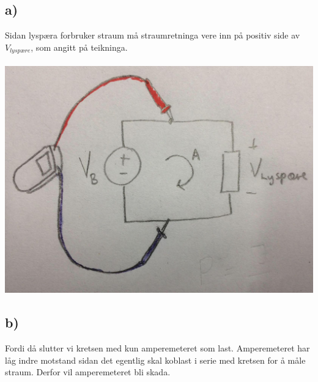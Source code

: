 \documentclass[12pt,a4paper]{article}
\begin{document}
    \subsection{a)}
      Sidan lyspæra forbruker straum må straumretninga vere inn på positiv
      side av $V_{lyspære}$, som angitt på teikninga. \\ \\
      \includegraphics[width=\textwidth]{01_9_a.png}

    \subsection{b)}
      Fordi då slutter vi kretsen med kun amperemeteret som last.
      Amperemeteret har låg indre motstand sidan det egentlig
      skal koblast i serie med kretsen for å måle straum.
      Derfor vil amperemeteret bli skada.
      
\end{document}
